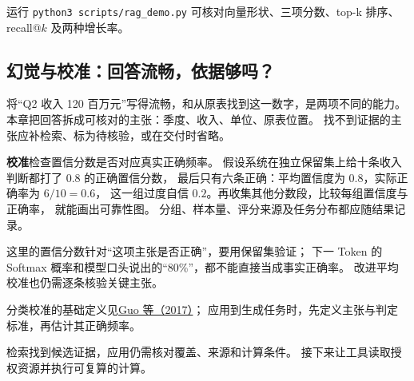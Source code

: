 运行 \texttt{python3 scripts/rag\_demo.py} 可核对向量形状、三项分数、top-k 排序、recall@$k$ 及两种增长率。


\subsection{幻觉与校准：回答流畅，依据够吗？}
\label{concept:hallucination-calibration}

将“Q2 收入 120 百万元”写得流畅，和从原表找到这一数字，是两项不同的能力。
本章把回答拆成可核对的主张：季度、收入、单位、原表位置。
找不到证据的主张应补检索、标为待核验，或在交付时省略。

\textbf{校准}检查置信分数是否对应真实正确频率。
假设系统在独立保留集上给十条收入判断都打了 $0.8$ 的正确置信分数，
最后只有六条正确：平均置信度为 $0.8$，实际正确率为 $6/10=0.6$，
这一组过度自信 $0.2$。再收集其他分数段，比较每组置信度与正确率，
就能画出可靠性图。
分组、样本量、评分来源及任务分布都应随结果记录。

\begin{boundarybox}
这里的置信分数针对“这项主张是否正确”，要用保留集验证；
下一 Token 的 Softmax 概率和模型口头说出的“80\%”，都不能直接当成事实正确率。
改进平均校准也仍需逐条核验关键主张。
\end{boundarybox}
分类校准的基础定义见\href{https://proceedings.mlr.press/v70/guo17a.html}{Guo 等（2017）}；
应用到生成任务时，先定义主张与判定标准，再估计其正确频率。

\par\smallskip
检索找到候选证据，应用仍需核对覆盖、来源和计算条件。
接下来让工具读取授权资源并执行可复算的计算。

